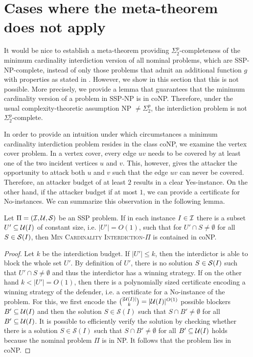 \section{Cases where the meta-theorem does not apply}\label{sec:noMeta}

It would be nice to establish a meta-theorem providing $\Sigma^p_2$-completeness of the minimum cardinality interdiction version of all nominal problems, which are SSP-NP-complete, instead of only those problems that admit an additional function $g$ with properties as stated in .
However, we show in this section that this is not possible.
More precisely, we provide a lemma that guarantees that the minimum cardinality version of a problem in SSP-NP is in coNP.
Therefore, under the usual complexity-theoretic assumption NP $\neq \Sigma^p_2$, the interdiction problem is not $\Sigma^p_2$-complete.

In order to provide an intuition under which circumstances a minimum cardinality interdiction problem resides in the class coNP, we examine the vertex cover problem.
In a vertex cover, every edge $uv$ needs to be covered by at least one of the two incident vertices $u$ and $v$.
This, however, gives the attacker the opportunity to attack both $u$ and $v$ such that the edge $uv$ can never be covered.
Therefore, an attacker budget of at least $2$ results in a clear Yes-instance.
On the other hand, if the attacker budget if at most $1$, we can provide a certificate for No-instances.
We can summarize this observation in the following lemma.

\begin{lemma}\label{lem:minCardInCoNP}
    Let $\Pi = (\mathcal{I}, \mathcal{U}, \mathcal{S})$ be an SSP problem.
    If in each instance $I \in \mathcal{I}$ there is a subset $U' \subseteq \mathcal{U}(I)$ of constant size, i.e. $|U'| = O(1)$, such that for $U' \cap S \neq \emptyset$ for all $S \in \mathcal{S}(I)$, then \textsc{Min Cardinality Interdiction-$\Pi$} is contained in coNP.
\end{lemma}
\begin{proof}
    Let $k$ be the interdiction budget.
    If $|U'| \leq k$, then the interdictor is able to block the whole set $U'$.
    By definition of $U'$, there is no solution $S \in \mathcal{S}(I)$ such that $U' \cap S \neq \emptyset$ and thus the interdictor has a winning strategy.
    If on the other hand $k < |U'| = O(1)$, then there is a polynomially sized certificate encoding a winning strategy of the defender, i.e. a certificate for a No-instance of the problem.
    For this, we first encode the ${|\mathcal{U}(I)| \choose k} = |\mathcal{U}(I)|^{O(1)}$ possible blockers $B' \subseteq \mathcal{U}(I)$ and then the solution $S \in \mathcal S(I)$ such that $S \cap B' \neq \emptyset$ for all $B' \subseteq \mathcal{U}(I)$.
    It is possible to efficiently verify the solution by checking whether there is a solution $S \in \mathcal S(I)$ such that $S \cap B' \neq \emptyset$ for all $B' \subseteq \mathcal{U}(I)$ holds because the nominal problem $\Pi$ is in NP.
    It follows that the problem lies in coNP.
\end{proof}

